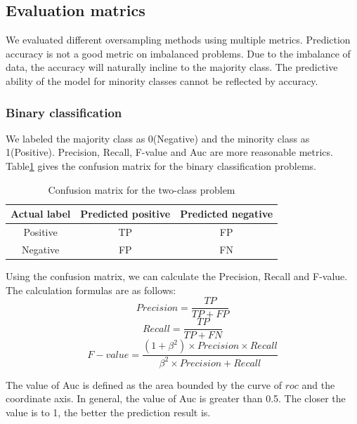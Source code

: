 \documentclass[runningheads]{llncs}
\begin{document}
\subsection{Evaluation matrics}

We evaluated different oversampling methods using multiple metrics. 
Prediction accuracy is not a good metric on imbalanced problems.
Due to the imbalance of data, the accuracy will naturally incline to the majority class.
The predictive ability of the model for minority classes cannot be reflected by accuracy.

\subsubsection{Binary classification}
We labeled the majority class as 0(Negative) and the minority class as 1(Positive).
Precision, Recall, F-value and Auc are more reasonable metrics.
Table\ref{table1} gives the confusion matrix for the binary classification problems.
\begin{table}[htbp]
  \caption{Confusion matrix for the two-class problem}
  \label{table1}
  \centering
  \begin{tabular}{@{}ccc@{}}
  \toprule
  Actual label & \multicolumn{1}{l}{Predicted positive} & \multicolumn{1}{l}{Predicted negative} \\ \midrule
  Positive     & TP                                     & FP                                     \\
  Negative     & FP                                     & FN                                     \\ \bottomrule
  \end{tabular}
  \end{table}
  Using the confusion matrix, 
  we can calculate the Precision, Recall and F-value. The calculation formulas are as follows:
  \begin{equation}
    Precision=\frac{TP}{TP+FP}
  \end{equation}
  \begin{equation}
    Recall=\frac{TP}{TP+FN}
  \end{equation}
  \begin{equation}
    F-value=\frac{(1+\beta^2) \times Precision \times Recall}{\beta^2 \times Precision+Recall}
  \end{equation}

  The value of Auc is defined as the area bounded by the curve of $roc$ and the coordinate axis.
In general, the value of Auc is greater than 0.5. 
The closer the value is to 1, the better the prediction result is.
\end{document}
